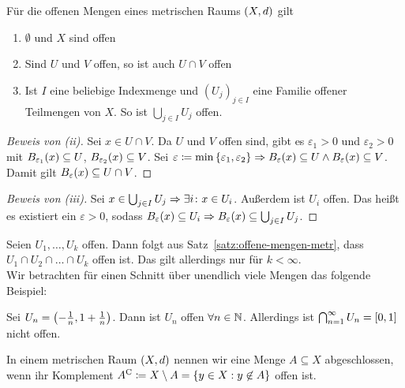 \begin{satz} %
    \label{satz:offene-mengen-metr}
    Für die offenen Mengen eines metrischen Raums $\left(X, d\right)$ gilt
    \begin{enumerate}[label=(\roman*)]
        \item $\emptyset$ und $X$ sind offen
        \item Sind $U$ und $V$ offen, so ist auch $U\cap V$ offen
        \item Ist $I$ eine beliebige Indexmenge und $(U_j)_{j\in I}$ eine Familie offener Teilmengen von $X$. So ist $\bigcup_{j\in I} U_j$ offen.
    \end{enumerate}

    \begin{proof}[Beweis von (ii)]
        Sei $x\in U\cap V$. Da $U$ und $V$ offen sind, gibt es $\varepsilon_1 > 0$ und $\varepsilon_2 > 0$ mit $B_{\varepsilon_1}\of{x}\subseteq U$, $B_{\varepsilon_2}\of{x}\subseteq V$. Sei $\varepsilon\coloneqq \min\set{\varepsilon_1, \varepsilon_2} \impl B_{\varepsilon}\of{x}\subseteq U\land B_{\varepsilon}\of{x}\subseteq V$. Damit gilt $B_{\varepsilon}\of{x}\subseteq U\cap V$.
    \end{proof}

    \begin{proof}[Beweis von (iii)]
        Sei $x\in \bigcup_{j\in I} U_j \Rightarrow{} \exists i\colon x\in U_{i}$. Außerdem ist $U_{i}$ offen. Das heißt es existiert ein $\varepsilon > 0$, sodass $B_{\varepsilon}\of{x}\subseteq U_{i} \impl B_{\varepsilon}\of{x}\subseteq \bigcup_{j\in I} U_{j}$.
    \end{proof}
\end{satz}

\begin{bemerkung}
    Seien $U_1, \ldots, U_k$ offen. Dann folgt aus Satz~\ref{satz:offene-mengen-metr}, dass $U_1\cap U_2\cap\dots\cap U_k$ offen ist. Das gilt allerdings nur für $k < \infty$.\\
    Wir betrachten für einen Schnitt über unendlich viele Mengen das folgende Beispiel:
\end{bemerkung}

\begin{beispiel}
    Sei $U_n = \left(-\frac{1}{n}, 1+\frac{1}{n}\right)$. Dann ist $U_n$ offen $\forall n\in\mathbb{N}$. Allerdings ist $\bigcap_{n=1}^{\infty} U_n = \left[0, 1\right]$ nicht offen.
\end{beispiel}

\begin{definition}
    In einem metrischen Raum $\left(X, d\right)$ nennen wir eine Menge $A\subseteq X$ abgeschlossen, wenn ihr Komplement $A^{\mathrm{C}}\coloneqq X \setminus A = \left\{y\in X: y\not\in A\right\}$ offen ist.
\end{definition}

